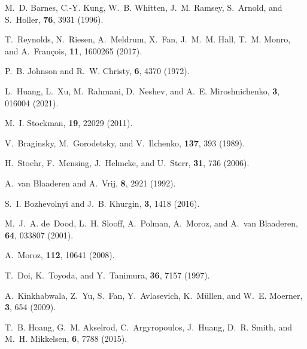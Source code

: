 \documentclass[9pt,twocolumn,twoside]{osajnl}
\begin{document}
\begin{thebibliography}{10}
M.~D. Barnes, C.-Y. Kung, W.~B. Whitten, J.~M. Ramsey, S.~Arnold, and
  S.~Holler, {\protect{}} \textbf{76}, 3931
  (1996).

T.~Reynolds, N.~Riesen, A.~Meldrum, X.~Fan, J.~M.~M. Hall, T.~M. Monro, and
  A.~Fran{\c{c}}ois, {\protect{}}
  \textbf{11}, 1600265 (2017).

P.~B. Johnson and R.~W. Christy, {\protect{}}
  \textbf{6}, 4370 (1972).

L.~Huang, L.~Xu, M.~Rahmani, D.~Neshev, and A.~E. Miroshnichenko,
  {\protect{}} \textbf{3}, 016004 (2021).

M.~I. Stockman, {\protect{}} \textbf{19}, 22029
  (2011).

V.~Braginsky, M.~Gorodetsky, and V.~Ilchenko, {\protect{}} \textbf{137}, 393 (1989).

H.~Stoehr, F.~Mensing, J.~Helmcke, and U.~Sterr, {\protect{}} \textbf{31}, 736 (2006).

A.~van Blaaderen and A.~Vrij, {\protect{}} \textbf{8},
  2921 (1992).

S.~I. Bozhevolnyi and J.~B. Khurgin, {\protect{}}
  \textbf{3}, 1418 (2016).

M.~J.~A. de~Dood, L.~H. Slooff, A.~Polman, A.~Moroz, and A.~van Blaaderen,
  {\protect{}} \textbf{64}, 033807 (2001).

A.~Moroz, {\protect{}}
  \textbf{112}, 10641 (2008).

T.~Doi, K.~Toyoda, and Y.~Tanimura, {\protect{}}
  \textbf{36}, 7157 (1997).

A.~Kinkhabwala, Z.~Yu, S.~Fan, Y.~Avlasevich, K.~M{\"{u}}llen, and W.~E.
  Moerner, {\protect{}} \textbf{3}, 654 (2009).

T.~B. Hoang, G.~M. Akselrod, C.~Argyropoulos, J.~Huang, D.~R. Smith, and M.~H.
  Mikkelsen, {\protect{}} \textbf{6}, 7788
  (2015).


\end{thebibliography}
\end{document}
